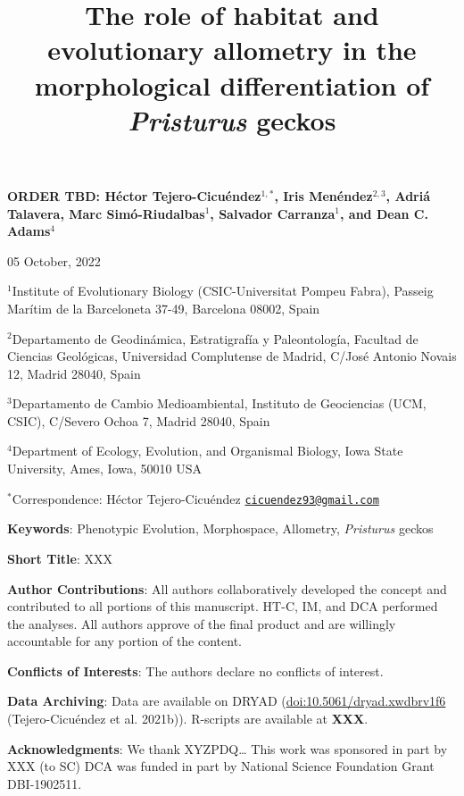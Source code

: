 \documentclass[
  11pt,
]{article}
\title{The role of habitat and evolutionary allometry in the
morphological differentiation of \emph{Pristurus} geckos}
\author{}
\date{\vspace{-2.5em}}
\begin{document}
\maketitle

\begin{center}
\textbf{ORDER TBD:  H{\'{e}}ctor Tejero-Cicu{\'{e}}ndez$^{1,*}$,  Iris Men{\'{e}}ndez$^{2,3}$, Adri{\'{a}} Talavera, Marc Sim{\'{o}}-Riudalbas$^{1}$, Salvador Carranza$^{1}$, and Dean C. Adams$^{4}$}
\end{center}

\begin{center}05 October, 2022\end{center}

\(^{1}\)Institute of Evolutionary Biology (CSIC-Universitat Pompeu
Fabra), Passeig Marítim de la Barceloneta 37-49, Barcelona 08002, Spain

\(^{2}\)Departamento de Geodinámica, Estratigrafía y Paleontología,
Facultad de Ciencias Geológicas, Universidad Complutense de Madrid,
C/José Antonio Novais 12, Madrid 28040, Spain

\(^{3}\)Departamento de Cambio Medioambiental, Instituto de Geociencias
(UCM, CSIC), C/Severo Ochoa 7, Madrid 28040, Spain

\(^{4}\)Department of Ecology, Evolution, and Organismal Biology, Iowa
State University, Ames, Iowa, 50010 USA

\(^{*}\)Correspondence: Héctor Tejero-Cicuéndez
\href{mailto:cicuendez93@gmail.com}{\nolinkurl{cicuendez93@gmail.com}}

\hfill\break

\textbf{Keywords}: Phenotypic Evolution, Morphospace, Allometry,
\emph{Pristurus} geckos \hfill\break

\textbf{Short Title}: XXX \hfill\break

\textbf{Author Contributions}: All authors collaboratively developed the
concept and contributed to all portions of this manuscript. HT-C, IM,
and DCA performed the analyses. All authors approve of the final product
and are willingly accountable for any portion of the
content.\hfill\break

\textbf{Conflicts of Interests}: The authors declare no conflicts of
interest.\hfill\break

\textbf{Data Archiving}: Data are available on DRYAD
(\url{doi:10.5061/dryad.xwdbrv1f6} (Tejero-Cicuéndez et al. 2021b)).
R-scripts are available at \textbf{XXX}. \hfill\break

\textbf{Acknowledgments}: We thank XYZPDQ\ldots{} This work was
sponsored in part by XXX (to SC) DCA was funded in part by National
Science Foundation Grant DBI-1902511.
\end{document}
